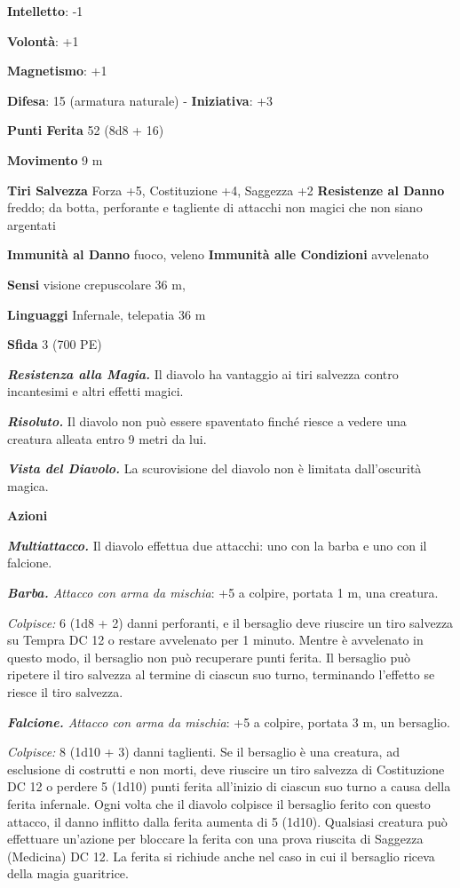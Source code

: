 \begin{multicols}{2}
\textbf{Intelletto}: -1

\textbf{Volontà}: +1

\textbf{Magnetismo}: +1

\textbf{Difesa}: 15 (armatura naturale) - \textbf{Iniziativa}: +3

\textbf{Punti Ferita} 52 (8d8 + 16)

\textbf{Movimento} 9 m

\textbf{Tiri Salvezza} Forza +5, Costituzione +4, Saggezza +2
\textbf{Resistenze al Danno} freddo; da botta, perforante e tagliente
di attacchi non magici che non siano argentati

\textbf{Immunità al Danno} fuoco, veleno \textbf{Immunità alle
Condizioni} avvelenato

\textbf{Sensi} visione crepuscolare 36 m, 

\textbf{Linguaggi} Infernale, telepatia 36 m 

\textbf{Sfida} 3 (700 PE)\smallskip

\emph{\textbf{Resistenza alla Magia.}} Il diavolo ha vantaggio ai tiri
salvezza contro incantesimi e altri effetti magici.

\emph{\textbf{Risoluto.}} Il diavolo non può essere spaventato finché
riesce a vedere una creatura alleata entro 9 metri da lui.

\emph{\textbf{Vista del Diavolo.}} La scurovisione del diavolo non è
limitata dall'oscurità magica.

\smallskip\textbf{Azioni}

\emph{\textbf{Multiattacco.}} Il diavolo effettua due attacchi: uno con
la barba e uno con il falcione.

\emph{\textbf{Barba.} Attacco con arma da mischia}: +5 a colpire,
portata 1 m, una creatura.

\emph{Colpisce:} 6 (1d8 + 2) danni perforanti, e il bersaglio deve
riuscire un tiro salvezza su Tempra DC 12 o restare avvelenato per
1 minuto. Mentre è avvelenato in questo modo, il bersaglio non può
recuperare punti ferita. Il bersaglio può ripetere il tiro salvezza al
termine di ciascun suo turno, terminando l'effetto se riesce il tiro
salvezza.

\emph{\textbf{Falcione.} Attacco con arma da mischia}: +5 a colpire,
portata 3 m, un bersaglio.

\emph{Colpisce:} 8 (1d10 + 3) danni taglienti. Se il bersaglio è una
creatura, ad esclusione di costrutti e non morti, deve riuscire un tiro
salvezza di Costituzione DC 12 o perdere 5 (1d10) punti ferita
all'inizio di ciascun suo turno a causa della ferita infernale. Ogni
volta che il diavolo colpisce il bersaglio ferito con questo attacco, il
danno inflitto dalla ferita aumenta di 5 (1d10). Qualsiasi creatura può
effettuare un'azione per bloccare la ferita con una prova riuscita di
Saggezza (Medicina) DC 12. La ferita si richiude anche nel caso in cui
il bersaglio riceva della magia guaritrice.




\end{multicols}
